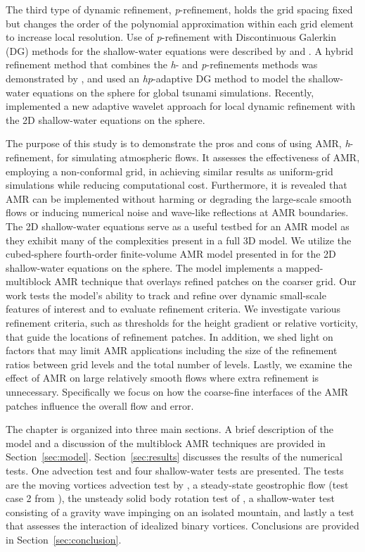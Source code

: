 The third type of dynamic refinement, \emph{p}-refinement, holds the
grid spacing fixed but changes the order of the polynomial approximation
within each grid element to increase local resolution.  Use of \emph{p}-refinement
with Discontinuous Galerkin (DG) methods for the shallow-water equations
were described by \cite{kubatko2009dynamic} and
\cite{tumolo2015semi}.  A hybrid refinement method that combines the
\emph{h}- and \emph{p}-refinements methods was demonstrated by
\cite{eskilsson2011hp}, and
\cite{blaise2012dynamic} used an \emph{hp}-adaptive DG method to model
the shallow-water equations on the sphere for global tsunami
simulations.  Recently,
\cite{aechtner2015conservative} implemented a new adaptive wavelet
approach for local dynamic refinement with the 2D shallow-water
equations on the sphere.

The purpose of this study is to demonstrate the pros and cons of using
AMR, \emph{h}-refinement, for simulating atmospheric flows.
It assesses the effectiveness of AMR, employing a 
non-conformal grid, in achieving
similar results as uniform-grid simulations while reducing computational cost. Furthermore,
it is revealed that AMR can be implemented without harming or degrading the
large-scale smooth flows or inducing numerical noise and wave-like
reflections at AMR boundaries.  The 2D shallow-water equations serve as
a useful testbed for an AMR model as they exhibit many of the
complexities present in a full 3D model.  We utilize the cubed-sphere
fourth-order finite-volume AMR model presented in
\cite{mccorquodale2015adaptive} for the 2D shallow-water equations on
the sphere.  The model implements a mapped-multiblock AMR technique that
overlays refined patches on the coarser grid. Our work tests
the model's ability to track and refine over dynamic small-scale
features of interest and to evaluate refinement criteria.  We
investigate various refinement criteria, such as thresholds for the
height gradient or relative vorticity, that guide the locations of refinement
patches.  In addition, we shed light on factors that may limit AMR
applications including the size of the refinement ratios between grid
levels and the total number of levels.  Lastly, we examine the
effect of AMR on large relatively smooth flows where extra refinement is
unnecessary.  Specifically we focus on how the coarse-fine interfaces of
the AMR patches influence the overall flow and error.

The chapter is organized into three main sections.  A brief
description of the model and a discussion of the multiblock AMR
techniques are provided in Section~\ref{sec:model}.
Section~\ref{sec:results} discusses the results of the numerical tests.  One advection test and four
shallow-water tests are presented.  The tests are the moving vortices
advection test by \cite{Nair:2008fk}, a steady-state geostrophic flow
(test case 2 from \cite{Williamson:1992kx}), the unsteady solid body rotation test of
\cite{Lauter:2005uq}, a shallow-water test consisting of a gravity wave
impinging on an isolated mountain, and lastly a test that assesses the
interaction of idealized binary vortices.  Conclusions are provided in
Section~\ref{sec:conclusion}.

